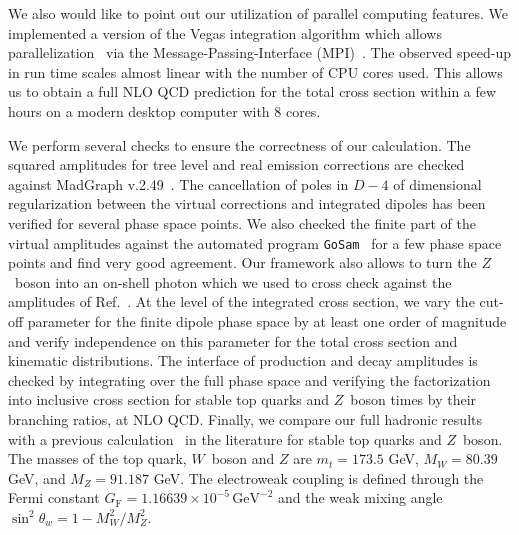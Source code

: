 \documentclass[preprint]{JHEP3}
\newcommand{\GeV}{\mathrm{GeV}}
\begin{document}
We also would like to point out our utilization of parallel computing features. 
We implemented a version of the Vegas integration algorithm which allows parallelization~\cite{pvegas} via the Message-Passing-Interface (MPI)~\cite{mpi-2-standard}. 
The observed speed-up in run time scales almost linear with the number of CPU cores used. 
This allows us to obtain a full NLO QCD prediction for the total cross section within a few hours on a modern desktop computer with 8 cores.

We perform several checks to ensure the correctness of our calculation. 
The squared amplitudes for tree level and real emission corrections are checked against MadGraph v.2.49~\cite{Stelzer:1994ta}. 
The cancellation of poles in $D-4$ of dimensional regularization between the virtual corrections and integrated dipoles has been verified for several phase space points.
We also checked the finite part of the virtual amplitudes against the automated program {\tt GoSam}~\cite{Cullen:2011ac} for a few phase space points and find
very good agreement. 
Our framework also allows to turn the $Z$~boson into an on-shell photon which we used to cross check against the amplitudes of Ref.~\cite{Melnikov:2011ta}. 
At the level of the integrated cross section, we vary the cut-off parameter for the finite dipole phase space by at least one order of magnitude and 
verify independence on this parameter for the total cross section and kinematic distributions.
The interface of production and decay amplitudes is checked by integrating over the full phase space and verifying the factorization into 
inclusive cross section for stable top quarks and $Z$~boson times by their branching ratios, at NLO QCD.
% 
Finally, we compare our full hadronic results with a previous calculation~\cite{Garzelli:2012bn} in the literature for stable top quarks and $Z$~boson.
The masses of the top quark, $W$~boson and $Z$ are $m_t=173.5$ GeV, $M_W=80.39$ GeV, and $M_Z=91.187$ GeV. 
The electroweak coupling is defined through the Fermi constant $G_\mathrm{F}=1.16639 \times 10^{-5} \, \GeV^{-2}$ and the weak mixing angle $\sin^2\theta_w = 1-M_W^2/M_Z^2$. 
\end{document}
